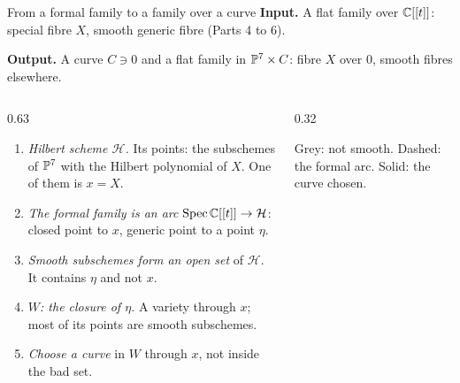 \begin{frame}{From a formal family to a family over a curve}
\textbf{Input.} A flat family over \(\mathbb C[[t]]\): special fibre \(X\), smooth generic fibre (Parts 4 to 6).
\par
\textbf{Output.} A curve \(C\ni0\) and a flat family in \(\mathbb P^7\times C\): fibre \(X\) over \(0\), smooth fibres elsewhere.
\begin{columns}[c]
\begin{column}{0.63\textwidth}
\begin{enumerate}
\setlength{\itemsep}{2pt}
\item \emph{Hilbert scheme \(\mathcal H\).} Its points: the subschemes of \(\mathbb P^7\) with the Hilbert polynomial of \(X\). One of them is \(x=X\).
\item \emph{The formal family is an arc} \(\operatorname{Spec}\mathbb C[[t]]\to\mathcal H\): closed point to \(x\), generic point to a point \(\eta\).
\item \emph{Smooth subschemes form an open set} of \(\mathcal H\). It contains \(\eta\) and not \(x\).
\item \emph{\(W\): the closure of \(\eta\).} A variety through \(x\); most of its points are smooth subschemes.
\item \emph{Choose a curve} in \(W\) through \(x\), not inside the bad set.
\end{enumerate}
\end{column}
\begin{column}{0.32\textwidth}\centering
{}
\par
{\small Grey: not smooth. Dashed: the formal arc. Solid: the curve chosen.}
\end{column}
\end{columns}
\end{frame}

